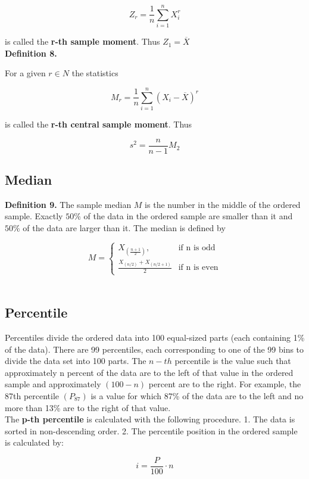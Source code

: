\documentclass[a4paper, 12pt]{article}
\begin{document}
\[ Z_r = \frac{1}{n}\sum_{i=1}^{n}X_i^r \]

is called the \textbf{r-th sample moment}. Thus $Z_1=\overline{X}$\\


\textbf{Definition 8.}

For a given $r\in N$ the statistics

\[ M_r = \frac{1}{n}\sum_{i=1}^{n} (X_i-\overline{X})^r \]

is called the \textbf{r-th central sample moment}. Thus

\[ s^2 = \frac{n}{n-1}M_2 \]

\subsection{Median}

\textbf{Definition 9.} The sample median $M$ is the number in the middle of the ordered sample. Exactly $50\%$ of the data in the ordered sample are smaller than it and $50\%$ of the data are larger than it. The median is defined by

\[
M=
\begin{cases}
  X_{(\frac{n+1}{2})}, & \text{if n is odd}\\
  \frac{X_{(n/2)}+X_{(n/2+1)}}{2} & \text{if n is even}
\end{cases}
\]\\

\subsection{Percentile}

Percentiles divide the ordered data into 100 equal-sized parts (each containing 1\% of the data). There are 99 percentiles, each corresponding to one of the 99 bins to divide the data set into 100 parts. The $n-th$ percentile is the value such that approximately n percent of the data are to the left of that value in the ordered sample and approximately $(100- n)$ percent are to the right. For example, the 87th percentile $(P_{87})$ is a value for which 87\% of the data are to the left and no more than 13\% are to the right of that
value. \\

The \textbf{p-th percentile} is calculated with the following procedure. 1. The data is sorted in non-descending order. 2. The percentile position in the ordered sample is calculated by:

\[ i = \frac{P}{100} \cdot n \]
\end{document}
